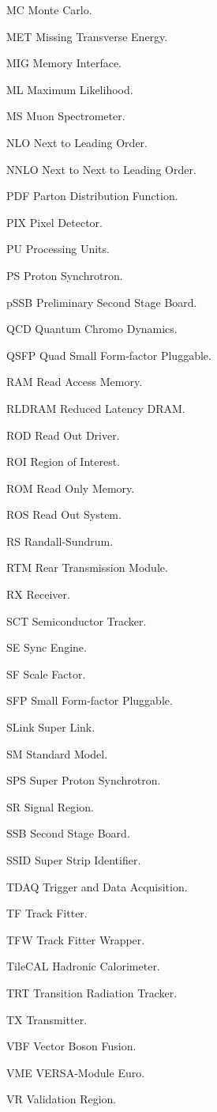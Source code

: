 \begin{symbollist*}
\item[MC] Monte Carlo.
\item[MET] Missing Transverse Energy.
\item[MIG] Memory Interface.
\item[ML] Maximum Likelihood.
\item[MS] Muon Spectrometer.
\item[NLO] Next to Leading Order.
\item[NNLO] Next to Next to Leading Order.
\item[PDF] Parton Distribution Function.
\item[PIX] Pixel Detector.
\item[PU] Processing Units.
\item[PS] Proton Synchrotron.
\item[pSSB] Preliminary Second Stage Board.
\item[QCD] Quantum Chromo Dynamics.
\item[QSFP] Quad Small Form-factor Pluggable.
\item[RAM] Read Access Memory.
\item[RLDRAM] Reduced Latency DRAM.
\item[ROD] Read Out Driver.
\item[ROI] Region of Interest.
\item[ROM] Read Only Memory.
\item[ROS] Read Out System.
\item[RS] Randall-Sundrum.
\item[RTM] Rear Transmission Module.
\item[RX] Receiver.
\item[SCT] Semiconductor Tracker.
\item[SE] Sync Engine.
\item[SF] Scale Factor.
\item[SFP] Small Form-factor Pluggable.
\item[SLink] Super Link.
\item[SM] Standard Model.
\item[SPS] Super Proton Synchrotron.
\item[SR] Signal Region.
\item[SSB] Second Stage Board.
\item[SSID] Super Strip Identifier.
\item[TDAQ] Trigger and Data Acquisition.
\item[TF] Track Fitter.
\item[TFW] Track Fitter Wrapper.
\item[TileCAL] Hadronic Calorimeter.
\item[TRT] Transition Radiation Tracker.
\item[TX] Transmitter.
\item[VBF] Vector Boson Fusion.
\item[VME] VERSA-Module Euro.
\item[VR] Validation Region.
\end{symbollist*}

